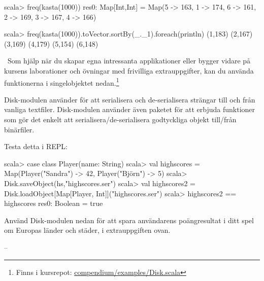 \begin{REPL}
scala> freq(kasta(1000))
res0: Map[Int,Int] = Map(5 -> 163, 1 -> 174, 6 -> 161, 2 -> 169, 3 -> 167, 4 -> 166)

scala> freq(kasta(1000)).toVector.sortBy(_._1).foreach(println)
(1,183)
(2,167)
(3,169)
(4,179)
(5,154)
(6,148)
\end{REPL}

\QUESTEND






\QUESTBEGIN

\Task\Uberkurs \what~Som hjälp när du skapar egna intressanta applikationer eller bygger vidare på kursens laborationer och övningar med frivilliga extrauppgifter, kan du använda funktionerna i singelobjektet  nedan.\footnote{Finns i kursrepot: \href{https://github.com/lunduniversity/introprog/blob/master/compendium/examples/Disk.scala}{compendium/examples/Disk.scala}}

Disk-modulen använder  för att serialisera och de-serialisera strängar till och från vanliga textfiler. Disk-modulen använder även paketet  för att erbjuda funktioner som gör det enkelt att serialisera/de-serialisera godtyckliga objekt till/från binärfiler.

Testa detta i REPL:
\begin{REPL}
scala> case class Player(name: String)
scala> val highscores = Map(Player("Sandra") -> 42, Player("Björn") -> 5)
scala> Disk.saveObject(hs,"highscores.ser")
scala> val highscores2 = Disk.loadObject[Map[Player, Int]]("highscores.ser")
scala> highscores2 == highscores
res0: Boolean = true
\end{REPL}
Använd Disk-modulen nedan för att spara användarens poängresultat i ditt spel om Europas länder och städer, i extrauppgiften ovan.

\begin{figure}
  \label{disk-access-code}
\end{figure}
\SOLUTION

\TaskSolved --

\QUESTEND



